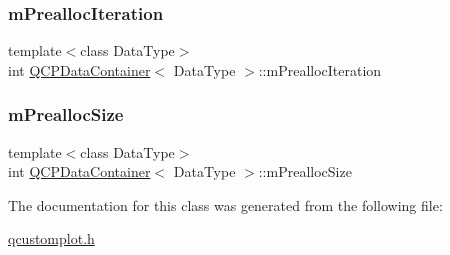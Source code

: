 \mbox{\label{class_q_c_p_data_container_ab2115bf023c29691f441eaf1889de84a}} 
\subsubsection{\texorpdfstring{m\+Prealloc\+Iteration}{mPreallocIteration}}
{\footnotesize\ttfamily template$<$class Data\+Type$>$ \\
int \hyperlink{class_q_c_p_data_container}{Q\+C\+P\+Data\+Container}$<$ Data\+Type $>$\+::m\+Prealloc\+Iteration\hspace{0.3cm}{\ttfamily [protected]}}

\mbox{\label{class_q_c_p_data_container_a3554d3ad00e69f7ce057efa00ea6f4b2}} 
\subsubsection{\texorpdfstring{m\+Prealloc\+Size}{mPreallocSize}}
{\footnotesize\ttfamily template$<$class Data\+Type$>$ \\
int \hyperlink{class_q_c_p_data_container}{Q\+C\+P\+Data\+Container}$<$ Data\+Type $>$\+::m\+Prealloc\+Size\hspace{0.3cm}{\ttfamily [protected]}}



The documentation for this class was generated from the following file\+:\begin{DoxyCompactItemize}
\item 
\hyperlink{qcustomplot_8h}{qcustomplot.\+h}\end{DoxyCompactItemize}
